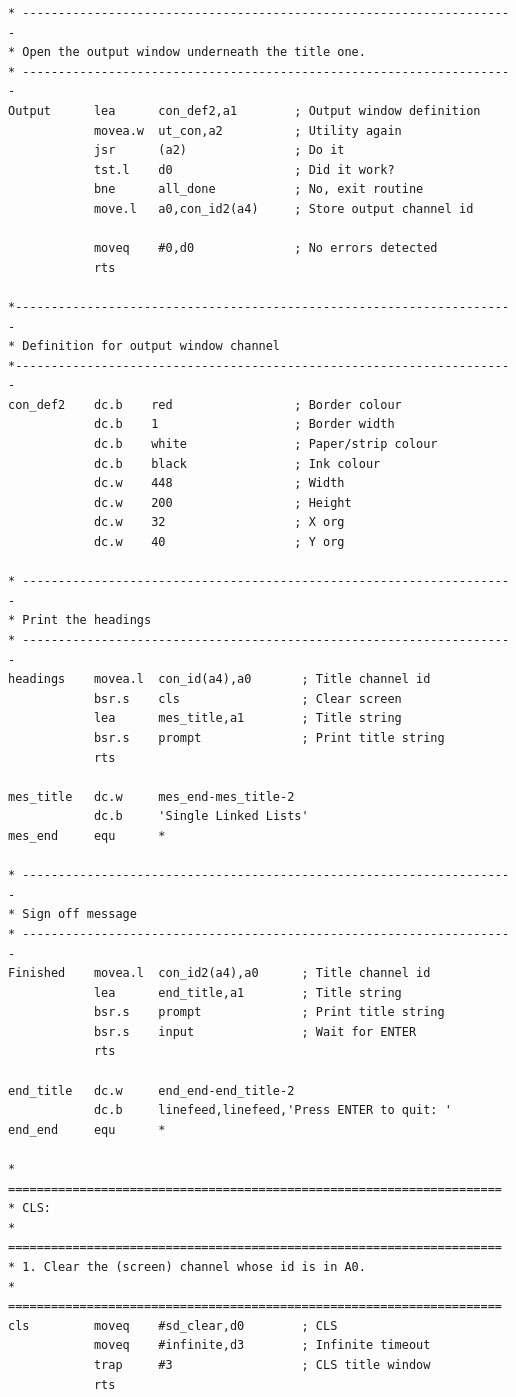 \begin{lstlisting}[firstnumber=last,caption={Linked Lists - Wrapper - Part 2},label={LinkedListsWrapperPart2}]
* ---------------------------------------------------------------------
* Open the output window underneath the title one.
* ---------------------------------------------------------------------
Output      lea      con_def2,a1        ; Output window definition
            movea.w  ut_con,a2          ; Utility again
            jsr      (a2)               ; Do it
            tst.l    d0                 ; Did it work?
            bne      all_done           ; No, exit routine
            move.l   a0,con_id2(a4)     ; Store output channel id

            moveq    #0,d0              ; No errors detected
            rts

*----------------------------------------------------------------------
* Definition for output window channel
*----------------------------------------------------------------------
con_def2    dc.b    red                 ; Border colour
            dc.b    1                   ; Border width
            dc.b    white               ; Paper/strip colour
            dc.b    black               ; Ink colour
            dc.w    448                 ; Width
            dc.w    200                 ; Height
            dc.w    32                  ; X org
            dc.w    40                  ; Y org

* ---------------------------------------------------------------------
* Print the headings
* ---------------------------------------------------------------------
headings    movea.l  con_id(a4),a0       ; Title channel id
            bsr.s    cls                 ; Clear screen
            lea      mes_title,a1        ; Title string
            bsr.s    prompt              ; Print title string
            rts

mes_title   dc.w     mes_end-mes_title-2
            dc.b     'Single Linked Lists'
mes_end     equ      *

* ---------------------------------------------------------------------
* Sign off message
* ---------------------------------------------------------------------
Finished    movea.l  con_id2(a4),a0      ; Title channel id
            lea      end_title,a1        ; Title string
            bsr.s    prompt              ; Print title string
            bsr.s    input               ; Wait for ENTER
            rts

end_title   dc.w     end_end-end_title-2
            dc.b     linefeed,linefeed,'Press ENTER to quit: '
end_end     equ      *

* =====================================================================
* CLS:
* =====================================================================
* 1. Clear the (screen) channel whose id is in A0.
* =====================================================================
cls         moveq    #sd_clear,d0        ; CLS
            moveq    #infinite,d3        ; Infinite timeout
            trap     #3                  ; CLS title window
            rts


\end{lstlisting}
